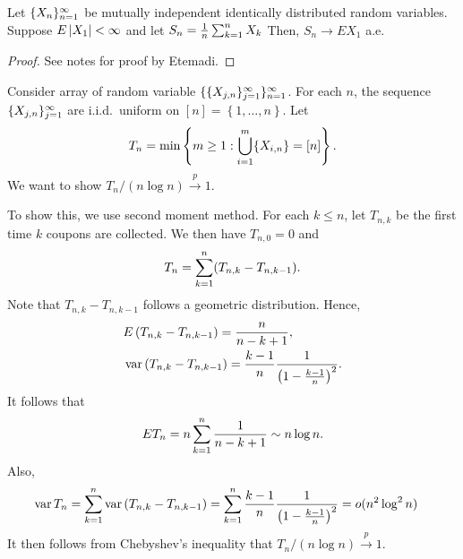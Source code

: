 \documentclass[a4paper]{article}
\newcommand{\convp}{\xrightarrow{p}}
\begin{document}
\begin{thm}
  Let $\{ X_n \}_{n=1}^\infty$ be mutually independent identically distributed
  random variables. Suppose $E \left\lvert X_1\right\rvert < \infty$
  and let $S_n = \frac{1}{n} \sum_{k=1}^n X_k$
  Then, $S_n \to E X_1$ a.e.\
\end{thm}

\begin{proof}
  See notes for proof by Etemadi.
\end{proof}

\begin{eg}
  Consider array of random variable $\{ \{ X_{j, n} \}_{j=1}^\infty \}_{n=1}^\infty$.
  For each $n$, the sequence $\{ X_{j, n} \}_{j=1}^\infty$
  are i.i.d.\ uniform on $[n] = \left\{ 1, \dots, n \right\}$.
  Let
  \[
    T_n = \min \left\{ m \geq 1 : \bigcup_{i=1}^m \{X_{i, n}\} = [n] \right\}.
  \]
  We want to show $T_n / (n \log n) \convp 1$.

  To show this, we use second moment method.
  For each $k \leq n$, let $T_{n, k}$ be the first time $k$ coupons
  are collected. We then have $T_{n, 0} = 0$ and
  \[
    T_n = \sum_{k=1}^n (T_{n, k} - T_{n, k - 1}).
  \]
  Note that $T_{n, k} - T_{n, k - 1}$ follows a geometric distribution.
  Hence,
  \begin{align*}
     & E \left( T_{n, k} - T_{n, k - 1} \right) = \frac{n}{n - k + 1}, \\
     & \operatorname{var} \left( T_{n, k} - T_{n, k - 1} \right) =
    \frac{k - 1}{n} \frac{1}{\left( 1 - \frac{k - 1}{n} \right)^2}.
  \end{align*}
  It follows that
  \[
    E T_n = n \sum_{k=1}^n \frac{1}{n - k + 1} \sim n \log n.
  \]
  Also,
  \begin{align*}
    \operatorname{var} T_n
     & = \sum_{k=1}^n \operatorname{var} \left( T_{n, k} - T_{n, k - 1} \right)
    = \sum_{k=1}^n \frac{k - 1}{n} \frac{1}{\left( 1 - \frac{k - 1}{n} \right)^2}
    = o(n^2 \log^2 n)
  \end{align*}
  It then follows from Chebyshev's inequality that
  $T_n / (n \log n) \convp 1$.

\end{eg}
\end{document}
